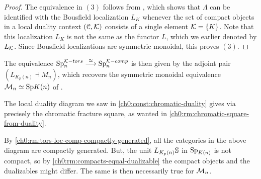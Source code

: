 \begin{proof}
    

    The equivalence in $(3)$ follows from \cite[2.34]{barthel-heard-valenzuela_2018}, which shows that $\Lambda$ can be identified with the Bousfield localization $L_K$ whenever the set of compact objects in a local duality context $(\C, \K)$ consists of a single element $\K=\{K\}$. Note that this localization $L_K$ is not the same as the functor $L$, which we earlier denoted by $L_\K$. Since Bousfield localizations are symmetric monoidal, this proves $(3)$. 
\end{proof}

\begin{remark}
    The equivalence $\sp\np^{\K-tors}\overset{\simeq}\longrightarrow \sp\np^{\K-comp}$ is then given by the adjoint pair $(L_{K_p(n)}\dashv M_n)$, which recovers the symmetric monoidal equivalence $\M\np \simeq \Sp\Kn$ of \cite[6.19]{hovey-strickland_99}. 
\end{remark}

\begin{remark}
    The local duality diagram we saw in \cref{ch0:const:chromatic-duality} gives via \cite[2.26]{barthel-heard-valenzuela_2018} precisely the chromatic fracture square, as wanted in \cref{ch0:rm:chromatic-square-from-duality}.   
\end{remark}

\begin{remark}
    By \cref{ch0:rm:tors-loc-comp-compactly-generated}, all the categories in the above diagram are compactly generated. But, the unit $L_{K_p(n)}\S$ in $\SpK$ is not compact, so by \cref{ch0:rm:compacts-equal-dualizable} the compact objects and the dualizables might differ. The same is then necessarily true for $\M\np$.
\end{remark}


